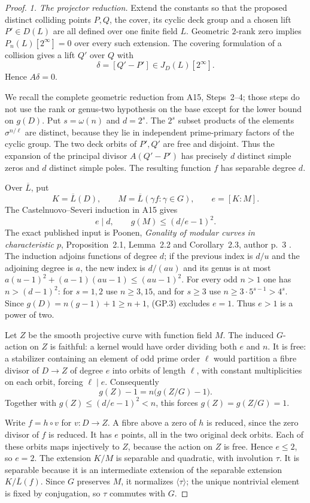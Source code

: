 \begin{proof}
\emph{1. The projector reduction.}
Extend the constants so that the proposed distinct colliding
points $P,Q$, the cover, its cyclic deck group and a chosen lift
$P'\in D(L)$ are all defined over one finite field $L$.
Geometric $2$-rank zero implies
$P_n(L)[2^\infty]=0$ over every such extension.
The covering formulation of a collision gives a lift $Q'$ over
$Q$ with
\[
                       \delta=[Q'-P']\in J_D(L)[2^\infty].
\]
Hence $A\delta=0$.

We recall the complete geometric reduction from A15,
Steps~2--4; those steps do not use the rank or genus-two
hypothesis on the base except for the lower bound on $g(D)$.
Put $s=\omega(n)$ and $d=2^s$.
The $2^s$ subset products of the elements $\sigma^{n/\ell}$
are distinct, because they lie in independent prime-primary
factors of the cyclic group.  The two deck orbits of $P',Q'$
are free and disjoint.  Thus the expansion of the principal
divisor $A(Q'-P')$ has precisely $d$ distinct simple zeros and
$d$ distinct simple poles.  The resulting function $f$ has
separable degree $d$.

Over $\overline L$, put
\[
 K=\overline L(D),\qquad
 M=\overline L(\gamma f:\gamma\in G),\qquad e=[K:M].
\]
The Castelnuovo--Severi induction in A15 gives
\[
                 e\mid d,\qquad g(M)\le(d/e-1)^2.
 \tag{GP.3}
\]
The exact published input is Poonen,
\emph{Gonality of modular curves in characteristic $p$},
Proposition~2.1, Lemma~2.2 and Corollary~2.3,
author p.~3 \cite{Poonen2007Gonality}.  The induction adjoins functions of degree $d$;
if the previous index is $d/u$ and the adjoining degree is $a$,
the new index is $d/(au)$ and its genus is at most
$a(u-1)^2+(a-1)(au-1)\le(au-1)^2$.
For every odd $n>1$ one has $n>(d-1)^2$:
for $s=1,2$ use $n\ge3,15$, and for $s\ge3$ use
$n\ge3\cdot5^{s-1}>4^s$.
Since $g(D)=n(g-1)+1\ge n+1$, (GP.3) excludes $e=1$.
Thus $e>1$ is a power of two.

Let $Z$ be the smooth projective curve with function field $M$.
The induced $G$-action on $Z$ is faithful: a kernel would have
order dividing both $e$ and $n$.
It is free: a stabilizer containing an element of odd prime
order $\ell$ would partition a fibre divisor of $D\to Z$
of degree $e$ into orbits of length $\ell$, with constant
multiplicities on each orbit, forcing $\ell\mid e$.
Consequently
\[
                 g(Z)-1=n\bigl(g(Z/G)-1\bigr).
\]
Together with $g(Z)\le(d/e-1)^2<n$, this forces
$g(Z)=g(Z/G)=1$.

Write $f=h\circ v$ for $v:D\to Z$.
A fibre above a zero of $h$ is reduced, since the zero divisor
of $f$ is reduced.  It has $e$ points, all in the two original
deck orbits.  Each of these orbits maps injectively to $Z$,
because the action on $Z$ is free.  Hence $e\le2$, so $e=2$.
The extension $K/M$ is separable and quadratic, with involution
$\tau$.  It is separable because it is an intermediate extension
of the separable extension $K/\overline L(f)$.
Since $G$ preserves $M$, it normalizes $\langle\tau\rangle$;
the unique nontrivial element is fixed by conjugation, so
$\tau$ commutes with $G$.


\end{proof}
